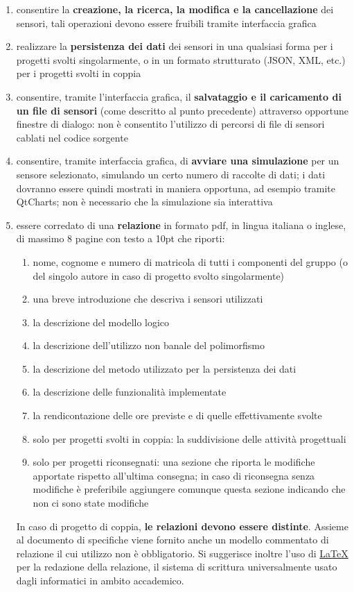 \documentclass[10pt,a4paper,oneside]{article}
\begin{document}
\begin{enumerate}
 \item consentire la \textbf{creazione, la ricerca, la modifica e la cancellazione} dei sensori, tali operazioni devono essere fruibili tramite interfaccia grafica
 \item realizzare la \textbf{persistenza dei dati} dei sensori in una qualsiasi forma per i progetti svolti singolarmente, o in un formato strutturato (JSON, XML, etc.) per i progetti svolti in coppia
 \item consentire, tramite l'interfaccia grafica, il \textbf{salvataggio e il caricamento di  un file di sensori} (come descritto al punto precedente) attraverso opportune finestre di dialogo: non è consentito l'utilizzo di percorsi di file di sensori cablati nel codice sorgente
 \item consentire, tramite interfaccia grafica, di \textbf{avviare una simulazione} per un sensore selezionato, simulando un certo numero di raccolte di dati; i dati dovranno essere quindi mostrati in maniera opportuna, ad esempio tramite QtCharts; non è necessario che la simulazione sia interattiva
 \item essere corredato di una \textbf{relazione} in formato pdf, in lingua italiana o inglese, di massimo 8 pagine con testo a 10pt che riporti:
 \begin{enumerate}
  \item nome, cognome e numero di matricola di tutti i componenti del gruppo (o del singolo autore in caso di progetto svolto singolarmente)
  \item una breve introduzione che descriva i sensori utilizzati
  \item la descrizione del modello logico
  \item la descrizione dell'utilizzo non banale del polimorfismo
  \item la descrizione del metodo utilizzato per la persistenza dei dati
  \item la descrizione delle funzionalità implementate
  \item la rendicontazione delle ore previste e di quelle effettivamente svolte
  \item solo per progetti svolti in coppia: la suddivisione delle attività progettuali
  \item solo per progetti riconsegnati: una sezione che riporta le modifiche apportate rispetto all'ultima consegna; in caso di riconsegna senza modifiche è preferibile aggiungere comunque questa sezione indicando che non ci sono state modifiche
 \end{enumerate}
 In caso di progetto di coppia, \textbf{le relazioni devono essere distinte}. Assieme al documento di specifiche viene fornito anche un modello commentato di relazione il cui utilizzo non è obbligatorio. Si suggerisce inoltre l'uso di \href{https://it.wikipedia.org/wiki/LaTeX}{LaTeX} per la redazione della relazione, il sistema di scrittura universalmente usato dagli informatici in ambito accademico.


\end{enumerate}
\end{document}
